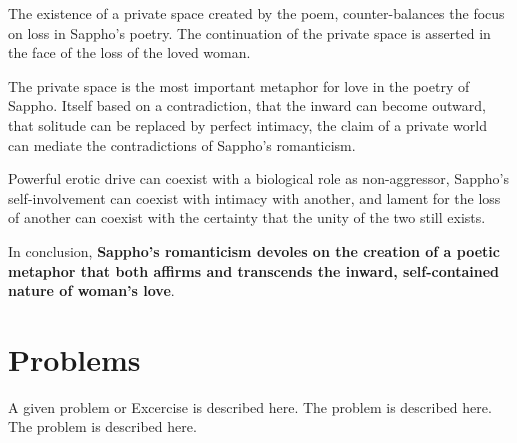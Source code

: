 The existence of a private space created by the poem, counter-balances the focus on loss in Sappho's poetry. The continuation of the private space is asserted in the face of the loss of the loved woman.

\begin{rmk}
    The private space is the most important metaphor for love in the poetry of Sappho. Itself based on a contradiction, that the inward can become outward, that solitude can be replaced by perfect intimacy, the claim of a private world can mediate the contradictions of Sappho's romanticism.

    Powerful erotic drive can coexist with a biological role as non-aggressor, Sappho's self-involvement can coexist with intimacy with another, and lament for the loss of another can coexist with the certainty that the unity of the two still exists.
\end{rmk}

In conclusion, \textbf{Sappho's romanticism devoles on the creation of a poetic metaphor that both affirms and transcends the inward, self-contained nature of woman's love}.


%
%
%


\section*{Problems}
%
\begin{prob}
\label{prob1}
A given problem or Excercise is described here. The
problem is described here. The problem is described here.
\end{prob}



